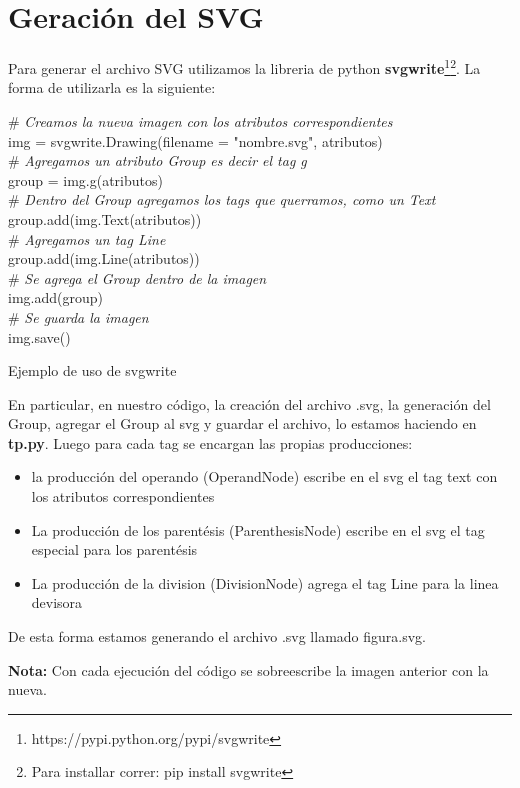 \section{Geraci\'on del SVG}
Para generar el archivo SVG utilizamos la libreria de python \textbf{svgwrite}\footnote{https://pypi.python.org/pypi/svgwrite}\footnote{Para installar correr: pip install svgwrite}. 
La forma de utilizarla es la siguiente:

\begin{algorithm}[H]
	\# \textit{\footnotesize{Creamos la nueva imagen con los atributos correspondientes}} \\
	img = svgwrite.Drawing(filename = "nombre.svg", atributos) \\
	\# \textit{\footnotesize{Agregamos un atributo Group es decir el tag g}} \\
	group = img.g(atributos) \\
	\# \textit{\footnotesize{Dentro del Group agregamos los tags que querramos, como un Text}} \\
	group.add(img.Text(atributos)) \\
	\# \textit{\footnotesize{Agregamos un tag Line}} \\
	group.add(img.Line(atributos)) \\
	\# \textit{\footnotesize{Se agrega el Group dentro de la imagen}} \\
	img.add(group) \\
	\# \textit{\footnotesize{Se guarda la imagen}} \\
	img.save()
    \caption{Ejemplo de uso de svgwrite}
\end{algorithm}

En particular, en nuestro c\'odigo, la creaci\'on del archivo .svg, la generaci\'on del Group, agregar el Group al svg y guardar el archivo, lo estamos haciendo en \textbf{tp.py}. Luego para cada tag se encargan las propias producciones:  

\begin{itemize}
  \item la producci\'on del operando (OperandNode) escribe en el svg el tag text con los atributos correspondientes
  \item La producci\'on de los parent\'esis (ParenthesisNode) escribe en el svg el tag especial para los parent\'esis
  \item La producci\'on de la division (DivisionNode) agrega el tag Line para la linea devisora
\end{itemize}

De esta forma estamos generando el archivo .svg llamado figura.svg. 

\textbf{Nota:} Con cada ejecuci\'on del c\'odigo se sobreescribe la imagen anterior con la nueva.

